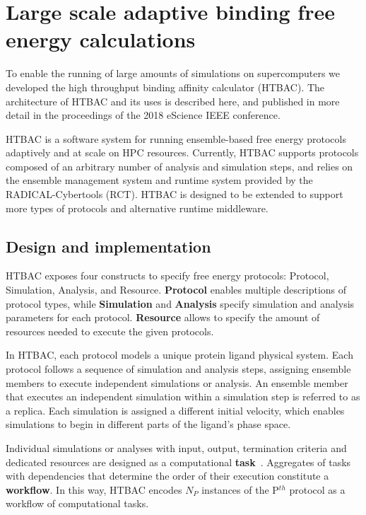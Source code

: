 \section{Large scale adaptive binding free energy calculations}

To enable the running of large amounts of simulations on supercomputers we developed the high throughput binding affinity calculator (HTBAC). The architecture of HTBAC and its uses is described here, and published in more detail in the proceedings of the 2018 eScience IEEE conference.
 
HTBAC is a software system for running ensemble-based free energy protocols
adaptively and at scale on HPC resources. Currently, HTBAC supports protocols
composed of an arbitrary number of analysis and simulation steps, and relies
on the ensemble management system and runtime system provided by the
RADICAL-Cybertools (RCT). HTBAC is designed to be extended to support more
types of protocols and alternative runtime middleware.

\subsection{Design and implementation}

HTBAC exposes four constructs to specify free energy protocols: Protocol,
Simulation, Analysis, and Resource. \textbf{Protocol} enables multiple
descriptions of protocol types, while \textbf{Simulation} and
\textbf{Analysis} specify simulation and analysis parameters for each
protocol. \textbf{Resource} allows to specify the amount of resources needed
to execute the given protocols.

In HTBAC, each protocol models a unique protein ligand physical system. Each
protocol follows a sequence of simulation and analysis steps, assigning
ensemble members to execute independent simulations or analysis. An ensemble
member that executes an independent simulation within a simulation step is
referred to as a replica. Each simulation is assigned a different initial
velocity, which enables simulations to begin in different parts of the
ligand's phase space.

Individual simulations or analyses with input, output, termination criteria
and dedicated resources are designed as a computational
\textbf{task}~\cite{power-of-many17}. Aggregates of tasks with dependencies
that determine the order of their execution constitute a \textbf{workflow}.
In this way, HTBAC encodes $N_P$ instances of the P$^{th}$ protocol as a
workflow of computational tasks.

